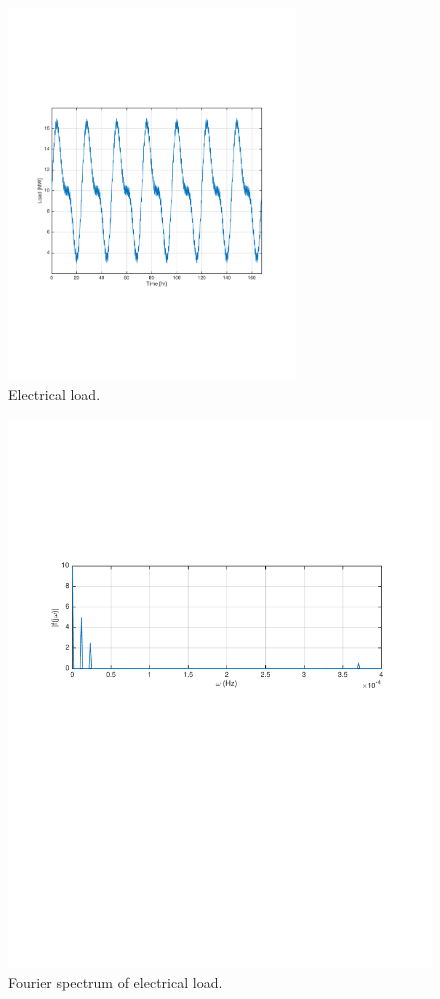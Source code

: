\documentclass[10pt]{article}
\begin{document}
\begin{figure}[!htb]
\begin{center}
\includegraphics[width=3in]{CBE660_HW8_file1.pdf}\caption{Electrical load.}\label{fig1}
\end{center}
\end{figure}


\begin{figure}[!htb]
\begin{center}
\includegraphics[width=5in]{CBE660_HW8_file2.pdf}\caption{Fourier spectrum of electrical load.}\label{fig2}
\end{center}
\end{figure}
\end{document}
